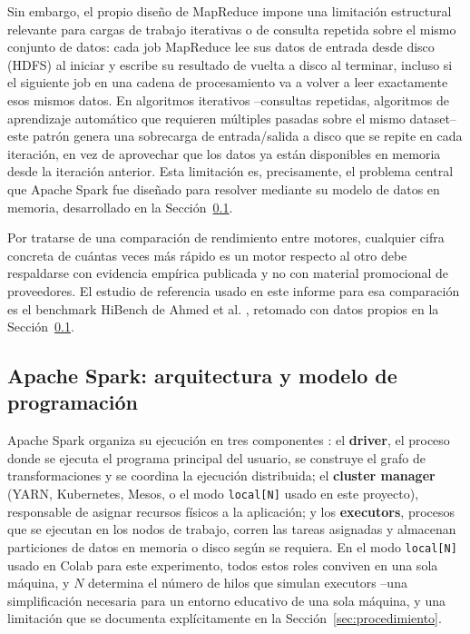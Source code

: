 \documentclass[11pt,a4paper]{article}
\begin{document}
Sin embargo, el propio dise\~no de MapReduce impone una limitaci\'on
estructural relevante para cargas de trabajo iterativas o de consulta
repetida sobre el mismo conjunto de datos: cada job MapReduce lee sus datos
de entrada desde disco (HDFS) al iniciar y escribe su resultado de vuelta a
disco al terminar, incluso si el siguiente job en una cadena de
procesamiento va a volver a leer exactamente esos mismos datos. En
algoritmos iterativos --consultas repetidas, algoritmos de aprendizaje
autom\'atico que requieren m\'ultiples pasadas sobre el mismo dataset-- este
patr\'on genera una sobrecarga de entrada/salida a disco que se repite en
cada iteraci\'on, en vez de aprovechar que los datos ya est\'an disponibles
en memoria desde la iteraci\'on anterior. Esta limitaci\'on es, precisamente,
el problema central que Apache Spark fue dise\~nado para resolver mediante
su modelo de datos en memoria, desarrollado en la Secci\'on~\ref{sec:fundamento-spark}.

Por tratarse de una comparaci\'on de rendimiento entre motores, cualquier
cifra concreta de cu\'antas veces m\'as r\'apido es un motor respecto al otro
debe respaldarse con evidencia emp\'irica publicada y no con material
promocional de proveedores. El estudio de referencia usado en este informe
para esa comparaci\'on es el benchmark HiBench de Ahmed et al.
\cite{ahmed2020}, retomado con datos propios en la Secci\'on~\ref{sec:fundamento-spark}.

\subsection{Apache Spark: arquitectura y modelo de programaci\'on}
\label{sec:fundamento-spark}

Apache Spark organiza su ejecuci\'on en tres componentes
\cite{zaharia2016,chambers2018}: el \textbf{driver}, el proceso donde se
ejecuta el programa principal del usuario, se construye el grafo de
transformaciones y se coordina la ejecuci\'on distribuida; el \textbf{cluster
manager} (YARN, Kubernetes, Mesos, o el modo \texttt{local[N]} usado en este
proyecto), responsable de asignar recursos f\'isicos a la aplicaci\'on; y los
\textbf{executors}, procesos que se ejecutan en los nodos de trabajo, corren
las tareas asignadas y almacenan particiones de datos en memoria o disco
seg\'un se requiera. En el modo \texttt{local[N]} usado en Colab para este
experimento, todos estos roles conviven en una sola m\'aquina, y $N$
determina el n\'umero de hilos que simulan executors --una simplificaci\'on
necesaria para un entorno educativo de una sola m\'aquina, y una limitaci\'on
que se documenta expl\'icitamente en la Secci\'on~\ref{sec:procedimiento}.
\end{document}
